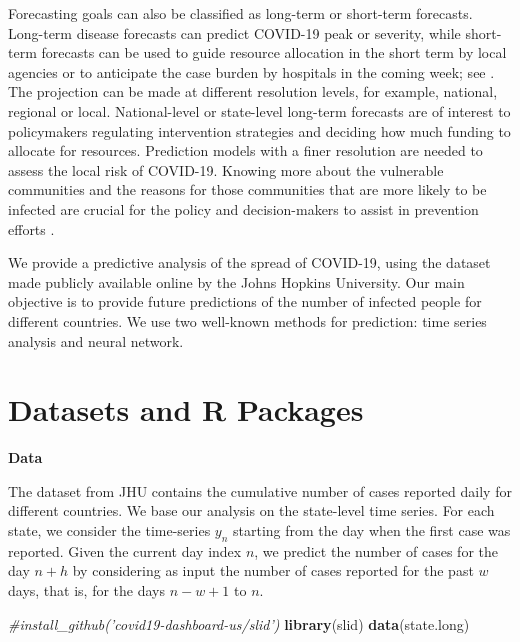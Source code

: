 \documentclass[]{book}
\newenvironment{Shaded}{\begin{snugshade}}{\end{snugshade}}
\newcommand{\KeywordTok}[1]{\textcolor[rgb]{0.13,0.29,0.53}{\textbf{#1}}}
\newcommand{\CommentTok}[1]{\textcolor[rgb]{0.56,0.35,0.01}{\textit{#1}}}
\newcommand{\NormalTok}[1]{#1}
\begin{document}
Forecasting goals can also be classified as long-term or short-term
forecasts. Long-term disease forecasts can predict COVID-19 peak or
severity, while short-term forecasts can be used to guide resource
allocation in the short term by local agencies or to anticipate the case
burden by hospitals in the coming week; see \citet{altieri2020curating}.
The projection can be made at different resolution levels, for example,
national, regional or local. National-level or state-level long-term
forecasts are of interest to policymakers regulating intervention
strategies and deciding how much funding to allocate for resources.
Prediction models with a finer resolution are needed to assess the local
risk of COVID-19. Knowing more about the vulnerable communities and the
reasons for those communities that are more likely to be infected are
crucial for the policy and decision-makers to assist in prevention
efforts \citep{altieri2020curating}.

We provide a predictive analysis of the spread of COVID-19, using the
dataset made publicly available online by the Johns Hopkins University.
Our main objective is to provide future predictions of the number of
infected people for different countries. We use two well-known methods
for prediction: time series analysis and neural network.

\section{Datasets and R Packages}\label{datasets-and-r-packages}

\textbf{Data}

The dataset from JHU contains the cumulative number of cases reported
daily for different countries. We base our analysis on the state-level
time series. For each state, we consider the time-series \(y_n\)
starting from the day when the first case was reported. Given the
current day index \(n\), we predict the number of cases for the day
\(n + h\) by considering as input the number of cases reported for the
past \(w\) days, that is, for the days \(n-w+1\) to \(n\).

\begin{Shaded}
\begin{Highlighting}[]
\CommentTok{#install_github('covid19-dashboard-us/slid')}
\KeywordTok{library}\NormalTok{(slid)}
\KeywordTok{data}\NormalTok{(state.long)}
\end{Highlighting}
\end{Shaded}
\end{document}
